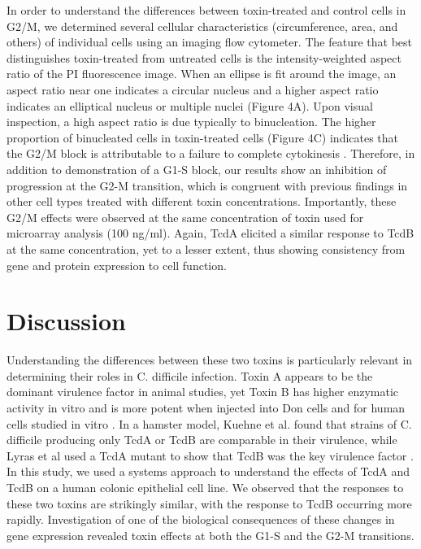 In order to understand the differences between toxin-treated and control cells in G2/M, we determined  several cellular characteristics (circumference, area, and others) of individual cells using an imaging flow cytometer. The feature that best distinguishes toxin-treated from untreated cells is the intensity-weighted aspect ratio of the PI fluorescence image. When an ellipse is fit around the image, an aspect ratio near one indicates a circular nucleus and a higher aspect ratio indicates an elliptical nucleus or multiple nuclei (Figure 4A). Upon visual inspection, a high aspect ratio is due typically to binucleation. The higher proportion of binucleated cells in toxin-treated cells (Figure 4C) indicates that the G2/M block is attributable to a failure to complete cytokinesis \cite{Huelsenbeck:2009di}. Therefore, in addition to demonstration of a G1-S block, our results show an inhibition of progression at the G2-M transition, which is congruent with previous findings \cite{Kim:2005jk, Gerhard:2008wz, Nottrott:2007ep, Fiorentini:1998uh} in other cell types treated with different toxin concentrations. Importantly, these G2/M effects were observed at the same concentration of toxin used for microarray analysis (100 ng/ml). Again, TcdA elicited a similar response to TcdB at the same concentration, yet to a lesser extent, thus showing consistency from gene and protein expression to cell function.

\section{Discussion}
Understanding the differences between these two toxins is particularly relevant in determining their roles in C. difficile infection. Toxin A appears to be the dominant virulence factor in animal studies, yet Toxin B has higher enzymatic activity in vitro and is more potent when injected into Don cells and for human cells studied in vitro \cite{ChavesOlarte:1997cs,Riegler:1995jz}. In a hamster model, Kuehne et al. found that strains of C. difficile producing only TcdA or TcdB are comparable in their virulence, while Lyras et al used a TcdA mutant to show that TcdB was the key virulence factor \cite{Kuehne:2010hv,Lyras:2009jx}. In this study, we used a systems approach to understand the effects of TcdA and TcdB on a human colonic epithelial cell line. We observed that the responses to these two toxins are strikingly similar, with the response to TcdB occurring more rapidly. Investigation of one of the biological consequences of these changes in gene expression revealed toxin effects at both the G1-S and the G2-M transitions.


